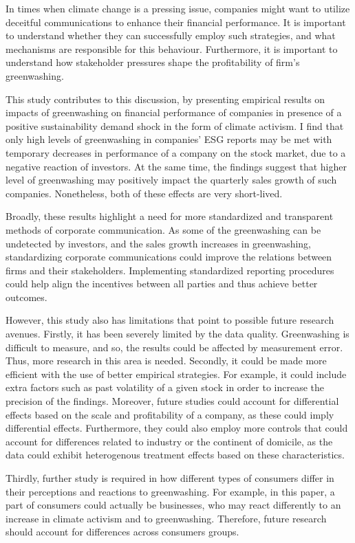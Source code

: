 \documentclass[12pt]{article}
\begin{document}
In times when climate change is a pressing issue, companies might want to utilize deceitful communications to enhance their financial performance. It is important to understand whether they can successfully employ such strategies, and what mechanisms are responsible for this behaviour. Furthermore, it is important to understand how stakeholder pressures shape the profitability of firm's greenwashing.

This study contributes to this discussion, by presenting empirical results on impacts of greenwashing on financial performance of companies in presence of a positive sustainability demand shock in the form of climate activism. I find that only high levels of greenwashing in companies' ESG reports may be met with temporary decreases in performance of a company on the stock market, due to a negative reaction of investors. At the same time, the findings suggest that higher level of greenwashing may positively impact the quarterly sales growth of such companies. Nonetheless, both of these effects are very short-lived. 

Broadly, these results highlight a need for more standardized and transparent methods of corporate communication. As some of the greenwashing can be undetected by investors, and the sales growth increases in greenwashing, standardizing corporate communications could improve the relations between firms and their stakeholders. Implementing standardized reporting procedures could help align the incentives between all parties and thus achieve better outcomes. 

However, this study also has limitations that point to possible future research avenues. Firstly, it has been severely limited by the data quality. Greenwashing is difficult to measure, and so, the results could be affected by measurement error. Thus, more research in this area is needed. Secondly, it could be made more efficient with the use of better empirical strategies. For example, it could include extra factors such as past volatility of a given stock in order to increase the precision of the findings. Moreover, future studies could account for differential effects based on the scale and profitability of a company, as these could imply differential effects. Furthermore, they could also employ more controls that could account for differences related to industry or the continent of domicile, as the data could exhibit heterogenous treatment effects based on these characteristics.  

Thirdly, further study is required in how different types of consumers differ in their perceptions and reactions to greenwashing. For example, in this paper, a part of consumers could actually be businesses, who may react differently to an increase in climate activism and to greenwashing. Therefore, future research should account for differences across consumers groups. 
\end{document}
